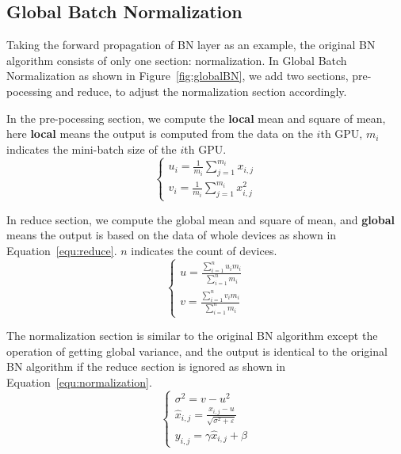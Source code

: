 \documentclass{llncs}
\begin{document}
\subsection{Global Batch Normalization}

Taking the forward propagation of BN layer as an example, the original
BN algorithm consists of only one section: normalization. 
In Global Batch Normalization as shown in Figure~\ref{fig:globalBN}, we add two sections, pre-pocessing and
reduce, to adjust the normalization section accordingly.


In the pre-pocessing section, we compute the \textbf{local} mean and square of mean, here \textbf{local} means the output is computed from the data on the $i$th GPU, $m_i$ indicates the mini-batch size of the $i$th GPU. 
\begin{equation}
\label{equ:prepocessing}
\left\{ {\begin{array}{*{20}{c}}
{{u_i} = \frac{1}{{{m_i}}}\sum\limits_{j = 1}^{{m_i}} {{x_{i,j}}} }\\
{{v_i} = \frac{1}{{{m_i}}}\sum\limits_{j = 1}^{{m_i}} {x_{i,j}^2} }
\end{array}} \right.
\end{equation}

In reduce section, we compute the global mean and square of mean, and \textbf{global} means the output is based on the data of whole devices as shown in Equation~\ref{equ:reduce}. $n$ indicates the count of devices.
\begin{equation}
\label{equ:reduce}
\left\{ {\begin{array}{*{20}{c}}
{u = \frac{{\sum\nolimits_{i = 1}^n {{u_i}{m_i}} }}{{\sum\nolimits_{i = 1}^n {{m_i}} }}}\\
{v = \frac{{\sum\nolimits_{i = 1}^n {{v_i}{m_i}} }}{{\sum\nolimits_{i = 1}^n {{m_i}} }}}
\end{array}} \right.
\end{equation}

The normalization section is similar to the original BN algorithm except the operation of getting global variance, and the output is identical to the original BN algorithm if the reduce section is ignored as shown in Equation~\ref{equ:normalization}.
\begin{equation}
\label{equ:normalization}
\left\{ {\begin{array}{*{20}{c}}
{{\sigma ^2} = v - {u^2}}\\
{{{\hat x}_{i,j}} = \frac{{{x_{i,j}} - u}}{{\sqrt {{\sigma ^2} + \varepsilon } }}}\\
{{y_{i,j}} = \gamma {{\hat x}_{i,j}} + \beta }
\end{array}} \right.
\end{equation}
\end{document}

